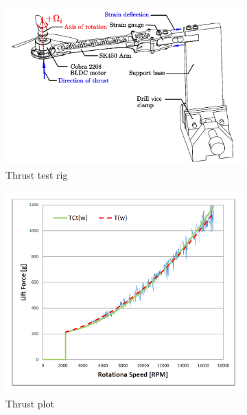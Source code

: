 \begin{figure}[htbp]
\begin{subfigure}{0.5\textwidth}
\centering
\includegraphics[width=\textwidth]{figs/thrust-rig}
\caption{Thrust test rig}
\label{fig:thrust-rig}
\end{subfigure}
\begin{subfigure}{0.5\textwidth}
\centering
\includegraphics[width=\textwidth]{graphs/thrust-plot}
\caption{Thrust plot}
\label{fig:thrust-plot}
\end{subfigure}
\\
\begin{subfigure}{0.5\textwidth}
\centering

\end{subfigure}
\end{figure}
